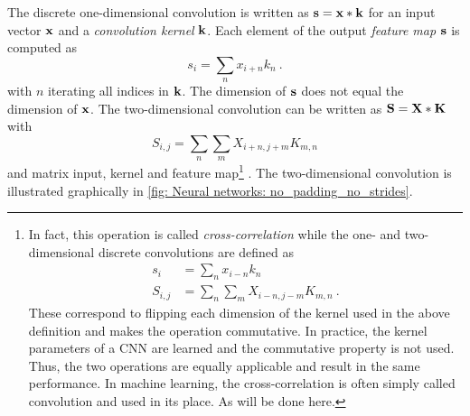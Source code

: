 The discrete one-dimensional convolution is written as ${\mathbf{s}} = {\mathbf{x}}*{\mathbf{k}}$ for an input vector ${\mathbf{x}}$ and a \textit{convolution kernel} ${\mathbf{k}}$. Each element of the output \textit{feature map} ${\mathbf{s}}$ is computed as
\begin{equation}\label{eq: Neural network: 1D convolution}
    s_{i} = \sum_n x_{i+n} k_n \ .
\end{equation}
with $n$ iterating all indices in ${\mathbf{k}}$. The dimension of ${\mathbf{s}}$ does not equal the dimension of ${\mathbf{x}}$.
The two-dimensional convolution can be written as ${\mathbf{S}} = {\mathbf{X}}*{\mathbf{K}}$ with
\begin{equation}\label{eq: Neural network: 2D convolution}
    S_{i,j} = \sum_n\sum_m X_{i+n,j+m}K_{m,n}
\end{equation}
and matrix input, kernel and feature map\footnote{In fact, this operation is called \textit{cross-correlation} while the one- and two-dimensional discrete convolutions are defined as
\begin{align*}
    s_{i} &= \sum_n x_{i-n} k_n\\
    S_{i,j} &= \sum_n\sum_m X_{i-n,j-m}K_{m,n} \ .
\end{align*}
These correspond to flipping each dimension of the kernel used in the above definition and makes the operation commutative. In practice, the kernel parameters of a \gls{CNN} are learned and the commutative property is not used. Thus, the two operations are equally applicable and result in the same performance. In machine learning, the cross-correlation is often simply called convolution and used in its place. As will be done here.} \cite{Goodfellow2016}. The two-dimensional convolution is illustrated graphically in \autoref{fig: Neural networks: no_padding_no_strides}. 
